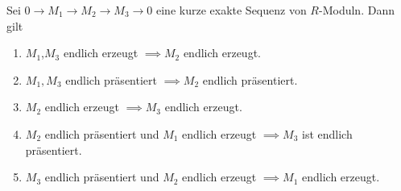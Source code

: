 \begin{Lemma}\label{Lem:ExSeqEndlPrä}
    Sei $0\to M_1\to M_2\to M_3\to 0$ eine kurze exakte Sequenz von $R$-Moduln. Dann gilt
    \begin{enumerate}
        \item $M_1$,$M_3$ endlich erzeugt $\implies M_2$ endlich erzeugt.
        \item $M_1,M_3$ endlich präsentiert $\implies M_2$ endlich präsentiert.
        \item $M_2$ endlich erzeugt $\implies M_3$ endlich erzeugt.
        \item $M_2$ endlich präsentiert und $M_1$ endlich erzeugt $\implies M_3$ ist endlich präsentiert.
        \item $M_3$ endlich präsentiert und $M_2$ endlich erzeugt $\implies M_1$ endlich erzeugt.
     \end{enumerate}
\end{Lemma}
